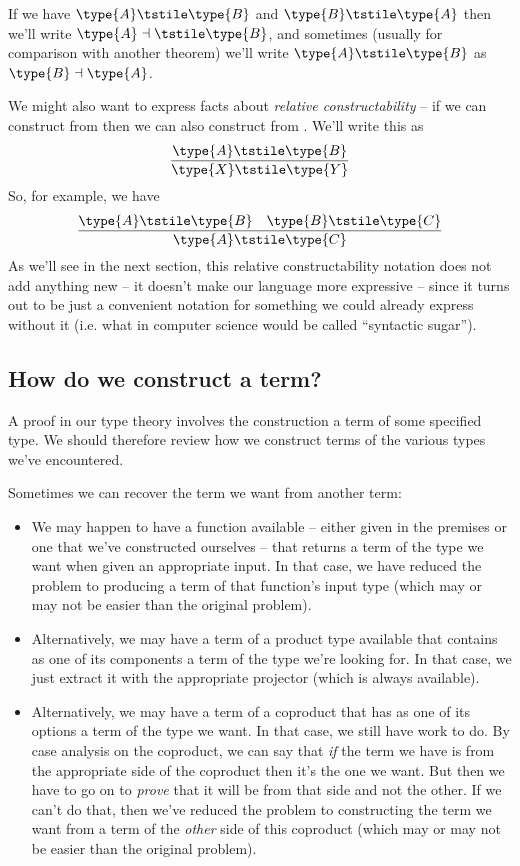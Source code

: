 If we have $\type{A} \tstile \type{B}$ and $\type{B} \tstile \type{A}$ then we'll write 
$\type{A} \dashv \tstile \type{B}$, and sometimes (usually for comparison with another theorem) we'll write $\type{A} \tstile \type{B}$ as $\type{B} \dashv \type{A}$.

We might also want to express facts about \emph{relative constructability} -- if we can construct  from  then we can also construct  from .  We'll write this as
\[
\frac{\type{A} \tstile \type{B}}
{\type{X} \tstile \type{Y}}
\]
So, for example, we have
\[
\frac{\type{A} \tstile \type{B} \quad \type{B} \tstile \type{C}}
{\type{A} \tstile \type{C}}
\]
As we'll see in the next section, this relative constructability notation does not add anything new -- it doesn't make our language more expressive -- since it turns out to be just a convenient notation for something we could already express without it (i.e. what in computer science would be called ``syntactic sugar'').



\subsection{How do we construct a term?}
\label{sec:DoingLogic-ConstructTerm}

A proof in our type theory involves the construction a term of some specified type.  We should therefore review how we construct terms of the various types we've encountered.

Sometimes we can recover the term we want from another term:
\begin{itemize}
\item We may happen to have a function available -- either given in the premises or one that we've constructed ourselves -- that returns a term of the type we want when given an appropriate input.  In that case, we have reduced the problem to producing a term of that function's input type (which may or may not be easier than the original problem). 

\item Alternatively, we may have a term of a product type available that contains as one of its components a term of the type we're looking for.  In that case, we just extract it with the appropriate projector (which is always available).  

\item Alternatively, we may have a term of a coproduct that has as one of its options a term of the type we want.  In that case, we still have work to do.  By case analysis on the coproduct, we can say that \emph{if} the term we have is from the appropriate side of the coproduct then it's the one we want.  But then we have to go on to \emph{prove} that it will be from that side and not the other.  If we can't do that, then we've reduced the problem to constructing the term we want from a term of the \emph{other} side of this coproduct (which may or may not be easier than the original problem). 
\end{itemize}

